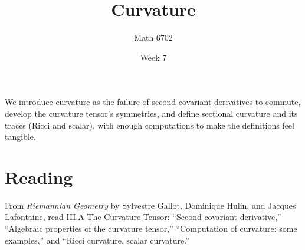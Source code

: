 \documentclass{article}
\title{Curvature}
\author{Math 6702}
\date{Week 7}
\begin{document}
\maketitle

We introduce curvature as the failure of second covariant derivatives to commute, develop the curvature tensor's symmetries, and define sectional curvature and its traces (Ricci and scalar), with enough computations to make the definitions feel tangible.

\section*{Reading}
From \textit{Riemannian Geometry} by Sylvestre Gallot, Dominique Hulin, and Jacques Lafontaine, read \textsection III.A The Curvature Tensor: ``Second covariant derivative,'' ``Algebraic properties of the curvature tensor,'' ``Computation of curvature: some examples,'' and ``Ricci curvature, scalar curvature.''
\end{document}
